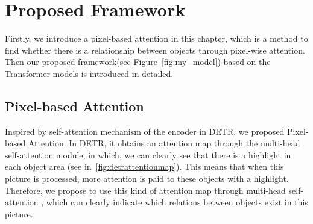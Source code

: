 \chapter{Proposed Framework}
\label{chap:framework}
Firstly, we introduce a pixel-based attention in this chapter, which is a method to find whether there is a relationship between objects through pixel-wise attention. Then our proposed framework(see Figure~\ref{fig:my_model}) based on the Transformer models is introduced in detailed.


\section{Pixel-based Attention}\label{sec:pixel_base}

Inspired by self-attention mechanism of the encoder in DETR, we proposed Pixel-based Attention. In DETR, it obtains an attention map through the multi-head self-attention module, in which, we can clearly see that there is a highlight in each object area (see in~\ref{fig:detrattentionmap}). This means that when this picture is processed, more attention is paid to these objects with a highlight. Therefore, we propose to use this kind of attention map through multi-head self-attention , which can clearly indicate which relations between objects exist in this picture.

